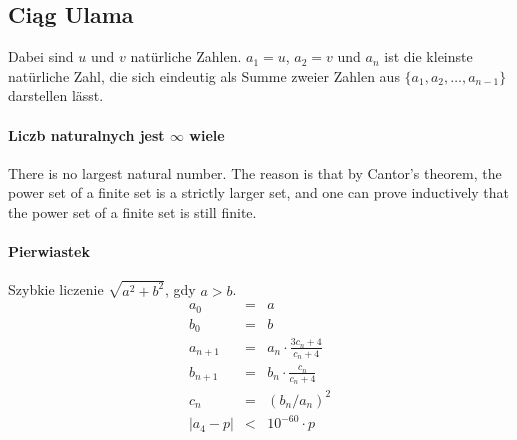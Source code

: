 \begin{parnumbers}
\begin{fkt}
\end{fkt}



\subsection{Ciąg Ulama}
Dabei sind $u$ und $v$ natürliche Zahlen. $a_1 = u$, $a_2 = v$ und $a_n$ ist die kleinste natürliche Zahl, die sich eindeutig als Summe zweier Zahlen aus $\lbrace a_1,a_2,\ldots,a_{n-1} \rbrace$ darstellen lässt.



\paragraph{Liczb naturalnych jest $\infty$ wiele} There is no largest natural number. The reason is that by Cantor's theorem, the power set of a finite set is a strictly larger set, and one can prove inductively that the power set of a finite set is still finite.

\paragraph{Pierwiastek} Szybkie liczenie $\sqrt{a^2+b^2}$, gdy $a>b$. %
\begin{eqnarray*}
a_0 & = & a \nonumber\\
b_0 & = & b \nonumber\\
a_{n+1} & = & a_n \cdot \frac{3c_n+4}{c_n+4} \nonumber\\
b_{n+1} & = & b_n\cdot \frac{c_n}{c_n+4}\nonumber\\
c_n  & = & (b_n / a_n)^2\nonumber\\
|a_4 - p| & < & 10^{-60} \cdot p
\end{eqnarray*}


\end{parnumbers}
